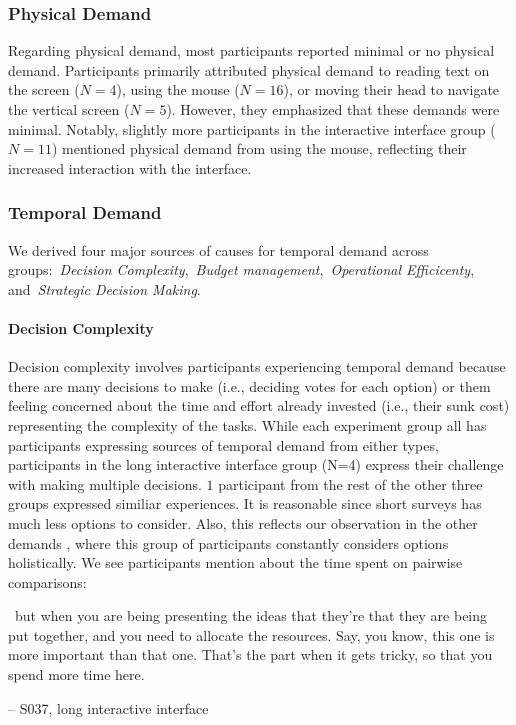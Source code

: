 
\subsubsection{Physical Demand}
Regarding physical demand, most participants reported minimal or no physical demand. Participants primarily attributed physical demand to reading text on the screen ($N=4$), using the mouse ($N=16$), or moving their head to navigate the vertical screen ($N=5$). However, they emphasized that these demands were minimal. Notably, slightly more participants in the interactive interface group ($N=11$) mentioned physical demand from using the mouse, reflecting their increased interaction with the interface.

\subsubsection{Temporal Demand}
We derived four major sources of causes for temporal demand across groups:~\textit{Decision Complexity},~\textit{Budget management},~\textit{Operational Efficicenty}, and~\textit{Strategic Decision Making}.

\paragraph{Decision Complexity}
Decision complexity involves participants experiencing temporal demand because there are many decisions to make (i.e., deciding votes for each option) or them feeling concerned about the time and effort already invested (i.e., their sunk cost) representing the complexity of the tasks. While each experiment group all has participants expressing sources of temporal demand from either types, participants in the long interactive interface group (N=4) express their challenge with making multiple decisions. $1$ participant from the rest of the other three groups expressed similiar experiences. It is reasonable since short surveys has much less options to consider. Also, this reflects our observation in the other demands , where this group of participants constantly considers options holistically. We see participants mention about the time spent on pairwise comparisons:
\begin{displayquote}
~\bracketellipsis but when you are being presenting the ideas that they're that they are being put together, and you need to allocate the resources. Say, you know, this one is more important than that one. That's the part when it gets tricky, so that you spend more time here.
    
\noindent \hfill -- S037, long interactive interface
\end{displayquote}

